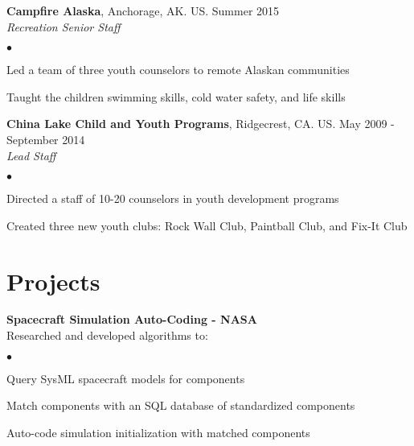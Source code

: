\documentclass[margin,line]{res}
\newenvironment{list2}{
  \begin{list}{$\bullet$}{%
      \setlength{\itemsep}{0in}
      \setlength{\parsep}{0in} \setlength{\parskip}{0in}
      \setlength{\topsep}{0in} \setlength{\partopsep}{0in}
      \setlength{\leftmargin}{0.2in}}}{\end{list}}
\begin{document}
\begin{resume}
{\bf Campfire Alaska}, Anchorage, AK. US. \hfill{Summer 2015}\\
{\em Recreation Senior Staff}\hfill 
\begin{list2} %
\item Led a team of three youth counselors to remote Alaskan communities  
\item Taught the children swimming skills, cold water safety, and life skills 
\end{list2}



{\bf China Lake Child and Youth Programs}, Ridgecrest, CA. US. \hfill{May 2009 - September 2014}\\
{\em Lead Staff}\hfill 
\begin{list2} %
\item Directed a staff of 10-20 counselors in youth development programs
\item Created three new youth clubs: Rock Wall Club, Paintball Club, and Fix-It Club
\end{list2}

\section{\sc Projects}
{\bf Spacecraft Simulation Auto-Coding - NASA}\\
{Researched and developed algorithms to:}
\begin{list2}
\item Query SysML spacecraft models for components
\item Match components with an SQL database of standardized components 
\item Auto-code simulation initialization with matched components
\end{list2}




\end{resume}
\end{document}
